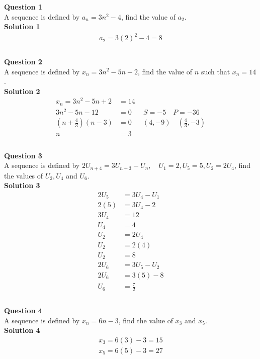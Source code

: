 \documentclass{article}
\begin{document}
\noindent\textbf{Question 1}\\[5pt]
A sequence is defined by $a_n=3n^2-4$, find the value of $a_2$.\\[5pt]
\noindent\textbf{Solution 1}\\[5pt]
\begin{align*}
a_2=3(2)^2-4=8\\[2pt]
\end{align*}\\[10pt]

\noindent\textbf{Question 2}\\[5pt]
A sequence is defined by $x_n=3n^2-5n+2$, find the value of $n$ such that $x_n=14$.\\[5pt]
\noindent\textbf{Solution 2}\\[5pt]
\begin{align*}
x_n=3n^2-5n+2&=14\\[2pt]
3n^2-5n-12&=0 \hspace{20pt} S=-5 \quad P=-36\\[2pt]
\left(n+\displaystyle\frac{4}{3}\right)(n-3)&=0 \hspace{19pt} (4,-9) \quad \left(\displaystyle\frac{4}{3},-3\right)\\[2pt]
n&=3\\
\end{align*}\\[10pt]

\noindent\textbf{Question 3}\\[5pt]
A sequence is defined by $2U_{n+4}=3U_{n+3}-U_n, \quad U_1=2,U_5=5, U_2=2U_4$, find the values of $U_2,U_4$ and $U_6$.\\[5pt]
\noindent\textbf{Solution 3}\\[5pt]
\begin{align*}
2U_5&=3U_4-U_1\\[2pt]
2(5)&=3U_4-2\\[2pt]
3U_4&=12\\[2pt]
U_4&=4\\[12pt]
U_2&=2U_4\\[2pt]
U_2&=2(4)\\[2pt]
U_2&=8\\[12pt]
2U_6&=3U_5-U_2\\[2pt]
2U_6&=3(5)-8\\[2pt]
U_6&=\displaystyle\frac{7}{2}\\
\end{align*}\\[10pt]

\noindent\textbf{Question 4}\\[5pt]
A sequence is defined by $x_n=6n-3$, find the value of $x_3$ and $x_5$.\\[5pt]
\noindent\textbf{Solution 4}\\[5pt]
\begin{align*}
x_3=6(3)-3=15\\[2pt]
x_5=6(5)-3=27\\[2pt]
\end{align*}\\[10pt]
\end{document}
